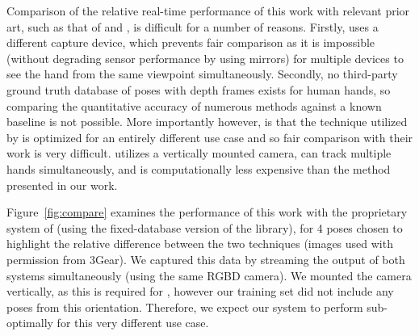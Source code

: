 Comparison of the relative real-time performance of this work with relevant prior art, such as that of \cite{3Gear} and \cite{Melax:2013}, is difficult for a number of reasons. Firstly, \cite{Melax:2013} uses a different capture device, which prevents fair comparison as it is impossible (without degrading sensor performance by using mirrors) for multiple devices to see the hand from the same viewpoint simultaneously. Secondly, no third-party ground truth database of poses with depth frames exists for human hands, so comparing the quantitative accuracy of numerous methods against a known baseline is not possible. More importantly however, is that the technique utilized by \cite{3Gear} is optimized for an entirely different use case and so fair comparison with their work is very difficult. \cite{3Gear} utilizes a vertically mounted camera, can track multiple hands simultaneously, and is computationally less expensive than the method presented in our work.

Figure~\ref{fig:compare} examines the performance of this work with the proprietary system of \cite{3Gear} (using the fixed-database version of the library), for 4 poses chosen to highlight the relative difference between the two techniques (images used with permission from 3Gear). We captured this data by streaming the output of both systems simultaneously (using the same RGBD camera). We mounted the camera vertically, as this is required for \cite{3Gear}, however our training set did not include any poses from this orientation.
Therefore, we expect our system to perform sub-optimally for this very different use case.

